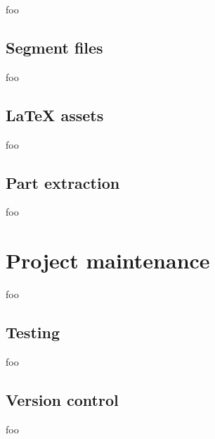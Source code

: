 foo

\subsection{Segment files}

foo

\subsection{LaTeX assets}

foo

\subsection{Part extraction}

foo

\section{Project maintenance}

foo

\subsection{Testing}

foo

\subsection{Version control}

foo